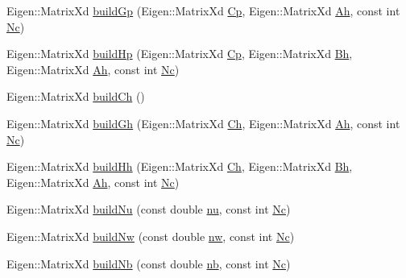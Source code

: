 \begin{DoxyCompactItemize}
Eigen\+::\+Matrix\+Xd \hyperlink{classZmpPreviewController_af9df60a716648bf74467f7a678c8420b}{build\+Gp} (Eigen\+::\+Matrix\+Xd \hyperlink{classZmpPreviewController_a1a63870dcc3d51a26c4adc9c97e650ff}{Cp}, Eigen\+::\+Matrix\+Xd \hyperlink{classZmpPreviewController_a8ee8ec415e25374f4fa687f5a5a6b9df}{Ah}, const int \hyperlink{classZmpPreviewController_af0c8b4aa92a6e3e95f80d81a8c91f693}{Nc})
\item 
Eigen\+::\+Matrix\+Xd \hyperlink{classZmpPreviewController_a4c46593f53f695cb1df53a2af180f4a0}{build\+Hp} (Eigen\+::\+Matrix\+Xd \hyperlink{classZmpPreviewController_a1a63870dcc3d51a26c4adc9c97e650ff}{Cp}, Eigen\+::\+Matrix\+Xd \hyperlink{classZmpPreviewController_a98bd07d03d0a6004b345ef4310cf17b6}{Bh}, Eigen\+::\+Matrix\+Xd \hyperlink{classZmpPreviewController_a8ee8ec415e25374f4fa687f5a5a6b9df}{Ah}, const int \hyperlink{classZmpPreviewController_af0c8b4aa92a6e3e95f80d81a8c91f693}{Nc})
\item 
Eigen\+::\+Matrix\+Xd \hyperlink{classZmpPreviewController_a58723464a66fc3a1122c613500bb2052}{build\+Ch} ()
\item 
Eigen\+::\+Matrix\+Xd \hyperlink{classZmpPreviewController_ac0e73fabb20f31dbbb85ce61414dbb87}{build\+Gh} (Eigen\+::\+Matrix\+Xd \hyperlink{classZmpPreviewController_a2093754713ffb2a7adcd1310c73bf775}{Ch}, Eigen\+::\+Matrix\+Xd \hyperlink{classZmpPreviewController_a8ee8ec415e25374f4fa687f5a5a6b9df}{Ah}, const int \hyperlink{classZmpPreviewController_af0c8b4aa92a6e3e95f80d81a8c91f693}{Nc})
\item 
Eigen\+::\+Matrix\+Xd \hyperlink{classZmpPreviewController_ad6e2263a5d1990e0734537ec6c6c0136}{build\+Hh} (Eigen\+::\+Matrix\+Xd \hyperlink{classZmpPreviewController_a2093754713ffb2a7adcd1310c73bf775}{Ch}, Eigen\+::\+Matrix\+Xd \hyperlink{classZmpPreviewController_a98bd07d03d0a6004b345ef4310cf17b6}{Bh}, Eigen\+::\+Matrix\+Xd \hyperlink{classZmpPreviewController_a8ee8ec415e25374f4fa687f5a5a6b9df}{Ah}, const int \hyperlink{classZmpPreviewController_af0c8b4aa92a6e3e95f80d81a8c91f693}{Nc})
\item 
Eigen\+::\+Matrix\+Xd \hyperlink{classZmpPreviewController_ad1322ec975c7d022feb24a40fff62f2e}{build\+Nu} (const double \hyperlink{classZmpPreviewController_ac611f084023404faba1ccfab573cd81d}{nu}, const int \hyperlink{classZmpPreviewController_af0c8b4aa92a6e3e95f80d81a8c91f693}{Nc})
\item 
Eigen\+::\+Matrix\+Xd \hyperlink{classZmpPreviewController_a96bed83f8441cfbd6d6fbff54c5b530d}{build\+Nw} (const double \hyperlink{classZmpPreviewController_a783427b817d77469e1f80426bede5310}{nw}, const int \hyperlink{classZmpPreviewController_af0c8b4aa92a6e3e95f80d81a8c91f693}{Nc})
\item 
Eigen\+::\+Matrix\+Xd \hyperlink{classZmpPreviewController_ab4ab5756eb9faf991a12b405d116292f}{build\+Nb} (const double \hyperlink{classZmpPreviewController_a6716ee4c94e6f91e608ee1e29fbc7051}{nb}, const int \hyperlink{classZmpPreviewController_af0c8b4aa92a6e3e95f80d81a8c91f693}{Nc})
\end{DoxyCompactItemize}
